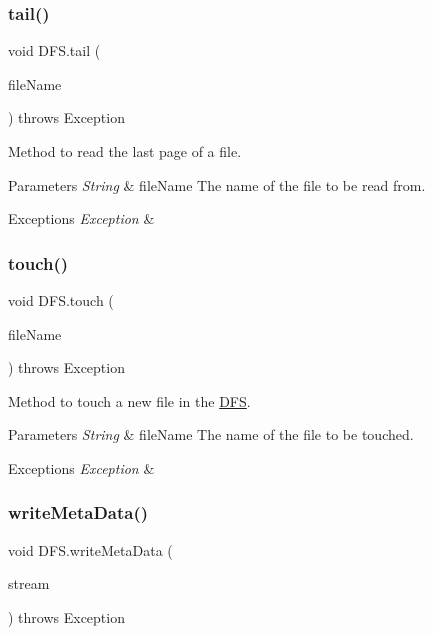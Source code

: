 \subsubsection{\texorpdfstring{tail()}{tail()}}
{\footnotesize\ttfamily void D\+F\+S.\+tail (\begin{DoxyParamCaption}\item[{String}]{file\+Name }\end{DoxyParamCaption}) throws Exception}

Method to read the last page of a file. 
\begin{DoxyParams}{Parameters}
{\em String} & file\+Name The name of the file to be read from. \\
\hline
\end{DoxyParams}

\begin{DoxyExceptions}{Exceptions}
{\em Exception} & \\
\hline
\end{DoxyExceptions}
\mbox{\label{class_d_f_s_ac44bf8288f4423fc87370b97f95f07c1}} 
\subsubsection{\texorpdfstring{touch()}{touch()}}
{\footnotesize\ttfamily void D\+F\+S.\+touch (\begin{DoxyParamCaption}\item[{String}]{file\+Name }\end{DoxyParamCaption}) throws Exception}

Method to touch a new file in the \hyperlink{class_d_f_s}{D\+FS}. 
\begin{DoxyParams}{Parameters}
{\em String} & file\+Name The name of the file to be touched. \\
\hline
\end{DoxyParams}

\begin{DoxyExceptions}{Exceptions}
{\em Exception} & \\
\hline
\end{DoxyExceptions}
\mbox{\label{class_d_f_s_ae97c5b386f9d638a2ca9ebd79665bb25}} 
\subsubsection{\texorpdfstring{write\+Meta\+Data()}{writeMetaData()}}
{\footnotesize\ttfamily void D\+F\+S.\+write\+Meta\+Data (\begin{DoxyParamCaption}\item[{Input\+Stream}]{stream }\end{DoxyParamCaption}) throws Exception}

